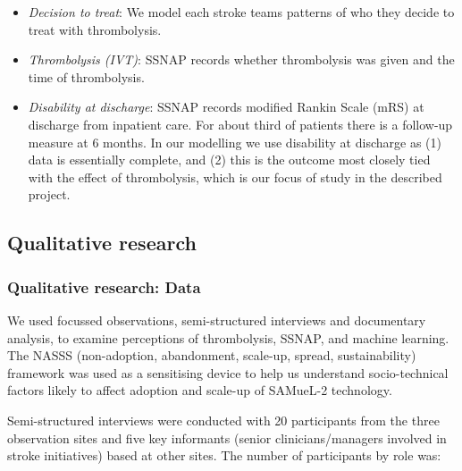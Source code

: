 \begin{itemize}
    \item \textit{Decision to treat}: We model each stroke teams patterns of who they decide to treat with thrombolysis.

    \item \textit{Thrombolysis (IVT)}: SSNAP records whether thrombolysis was given and the time of thrombolysis.

    \item \textit{Disability at discharge}: SSNAP records modified Rankin Scale (mRS) at discharge from inpatient care. For about third of patients there is a follow-up measure at 6 months. In our modelling we use disability at discharge as (1) data is essentially complete, and (2) this is the outcome most closely tied with the effect of thrombolysis, which is our focus of study in the described project.

\end{itemize}

\subsection{Qualitative research}

\subsubsection{Qualitative research: Data}

We used focussed observations, semi-structured interviews and documentary analysis, to examine perceptions of thrombolysis, SSNAP, and machine learning. The NASSS (non-adoption, abandonment, scale-up, spread, sustainability) framework \cite{greenhalgh_beyond_2017} was used as a sensitising device to help us understand socio-technical factors likely to affect adoption and scale-up of SAMueL-2 technology.

Semi-structured interviews were conducted with 20 participants from the three observation sites and five key informants (senior clinicians/managers involved in stroke initiatives) based at other sites. The number of participants by role was:


